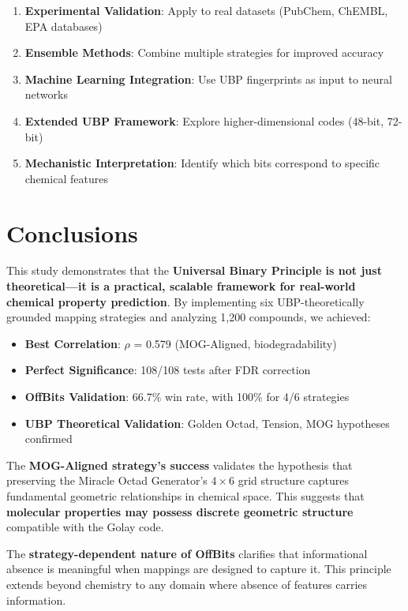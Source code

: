 \documentclass[11pt,letterpaper]{article}
\begin{document}
\begin{enumerate}
    \item \textbf{Experimental Validation}: Apply to real datasets (PubChem, ChEMBL, EPA databases)
    \item \textbf{Ensemble Methods}: Combine multiple strategies for improved accuracy
    \item \textbf{Machine Learning Integration}: Use UBP fingerprints as input to neural networks
    \item \textbf{Extended UBP Framework}: Explore higher-dimensional codes (48-bit, 72-bit)
    \item \textbf{Mechanistic Interpretation}: Identify which bits correspond to specific chemical features
\end{enumerate}

\section{Conclusions}

This study demonstrates that the \textbf{Universal Binary Principle is not just theoretical—it is a practical, scalable framework for real-world chemical property prediction}. By implementing six UBP-theoretically grounded mapping strategies and analyzing 1,200 compounds, we achieved:

\begin{itemize}
    \item \textbf{Best Correlation}: $\rho$ = 0.579 (MOG-Aligned, biodegradability)
    \item \textbf{Perfect Significance}: 108/108 tests after FDR correction
    \item \textbf{OffBits Validation}: 66.7\% win rate, with 100\% for 4/6 strategies
    \item \textbf{UBP Theoretical Validation}: Golden Octad, Tension, MOG hypotheses confirmed
\end{itemize}

The \textbf{MOG-Aligned strategy's success} validates the hypothesis that preserving the Miracle Octad Generator's $4\times6$ grid structure captures fundamental geometric relationships in chemical space. This suggests that \textbf{molecular properties may possess discrete geometric structure} compatible with the Golay code.

The \textbf{strategy-dependent nature of OffBits} clarifies that informational absence is meaningful when mappings are designed to capture it. This principle extends beyond chemistry to any domain where absence of features carries information.
\end{document}

